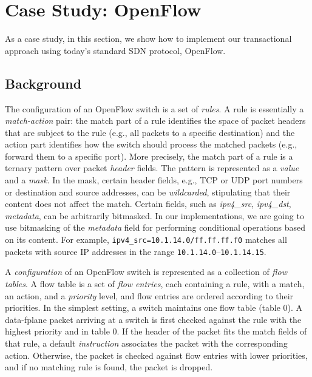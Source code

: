 \documentclass[conference]{sigcomm-alternate}
\newcommand{\liron}[1]{\textit{\textcolor{mypurple}{[liron]: #1}}} %
\newcommand{\petr}[1]{\textit{\textcolor{blue}{[petr]: #1}}} %
\begin{document}
\section{Case Study: OpenFlow}\label{sec:background}

As a case study, in this section, we show how to implement
our transactional approach using today's standard SDN protocol,
 OpenFlow. 

\subsection{Background}

The configuration of an OpenFlow switch is a set of
\emph{rules}.
A rule is essentially a \emph{match-action} pair:
the match part of a rule identifies the space of packet headers that are
subject to the rule (e.g., all packets to a specific destination) and
the action part identifies how the switch should process the matched
packets (e.g., forward them to a specific port).
More precisely, the match part of a rule is
a ternary pattern over packet \emph{header} fields.
The pattern is represented as a \emph{value} and a \emph{mask}.
In the mask, certain header fields, e.g., TCP or UDP port numbers or destination and source
addresses, can be \emph{wildcarded}, stipulating that their content does
not affect the match.
Certain fields, such as \emph{ipv4\_src}, \emph{ipv4\_dst}, \emph{metadata}, can be arbitrarily
bitmasked.
In our implementations, we are going to use bitmasking of the \emph{metadata}
field for performing conditional operations based on  its content.
For example, \texttt{ipv4\_src=10.1.14.0/ff.ff.ff.f0} matches all packets
with source IP addresses in the range \texttt{10.1.14.0}--\texttt{10.1.14.15}.

A \emph{configuration} of an OpenFlow switch is represented as a
collection of \emph{flow tables}.
A flow table is a set of \emph{flow entries}, each containing a rule,
with a match, an action, and a \emph{priority} level, and flow entries
are ordered according to their priorities.
In the simplest setting, a switch maintains one flow table (table 0).
A data-fplane packet arriving at a switch is first checked against
the rule with the highest priority and in table $0$.
If the header of the packet fits the match fields of that rule,
a default \emph{instruction} associates the packet with the corresponding action.
Otherwise, the packet is checked against flow  entries with lower
priorities, and if no matching rule is found, the packet is dropped.
\end{document}
